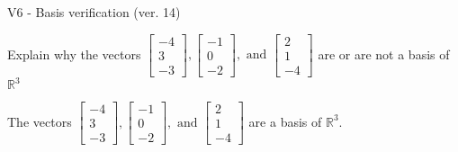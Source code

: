 \begin{exercise}
  \begin{exerciseTitle}V6 - Basis verification (ver. 14)\end{exerciseTitle}
  \begin{exerciseStatement}
    Explain why the vectors \(\left[\begin{array}{r}
-4 \\
3 \\
-3
\end{array}\right] , \left[\begin{array}{r}
-1 \\
0 \\
-2
\end{array}\right] , \text{ and } \left[\begin{array}{r}
2 \\
1 \\
-4
\end{array}\right]\) are or are not a basis of \(\mathbb{R}^3\)	


  \end{exerciseStatement}
  \begin{exerciseAnswer}
   The vectors \(\left[\begin{array}{r}
-4 \\
3 \\
-3
\end{array}\right] , \left[\begin{array}{r}
-1 \\
0 \\
-2
\end{array}\right] , \text{ and } \left[\begin{array}{r}
2 \\
1 \\
-4
\end{array}\right]\) 
  	 are  a basis of \(\mathbb{R}^3\).
  


  \end{exerciseAnswer}
\end{exercise}